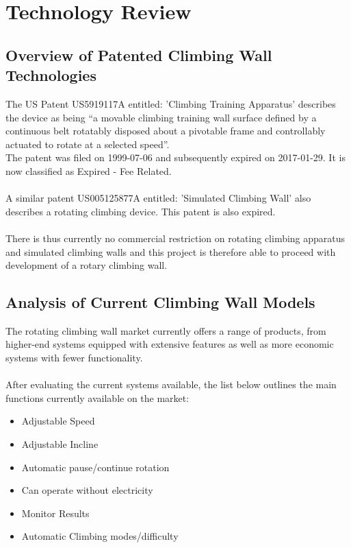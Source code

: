 \chapter{Technology Review}
\label{chap:technology_review}

\section{Overview of Patented Climbing Wall Technologies}

The US Patent US5919117A entitled: 'Climbing Training Apparatus' \cite{US5919117A} describes the device as being “a movable climbing training wall surface defined by a continuous belt rotatably disposed about a pivotable frame and controllably actuated to rotate at a selected speed”.\\
The patent was filed on 1999-07-06 and subsequently expired on 2017-01-29. It is now classified as Expired - Fee Related.\\\\
A similar patent US005125877A entitled: 'Simulated Climbing Wall' \cite{US5125877A} also describes a rotating climbing device. This patent is also expired.\\\\
There is thus currently no commercial restriction on rotating climbing apparatus and simulated climbing walls and this project is therefore able to proceed with development of a rotary climbing wall.

\section{Analysis of Current Climbing Wall Models}
The rotating climbing wall market currently offers a range of products, from higher-end systems equipped with extensive features as well as more economic systems with fewer functionality. \\\\
After evaluating the current systems available, the list below outlines the main functions currently available on the market:

\begin{itemize}
    \item Adjustable Speed
    \item Adjustable Incline
    \item Automatic pause/continue rotation
    \item Can operate without electricity
    \item Monitor Results
    \item Automatic Climbing modes/difficulty
\end{itemize}

